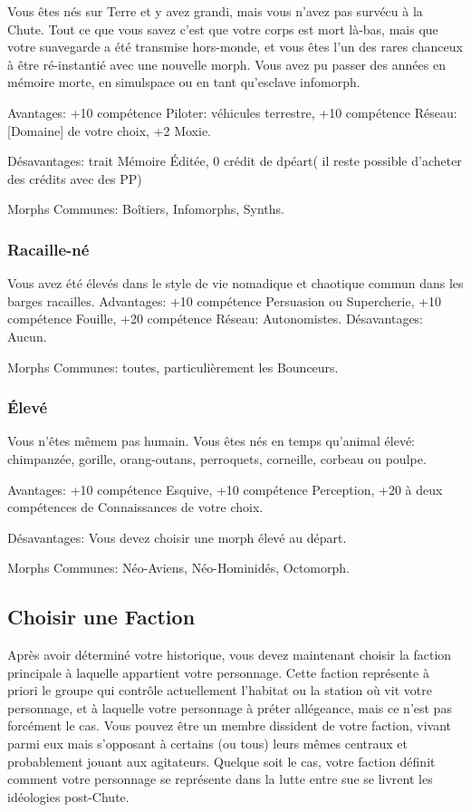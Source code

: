 Vous êtes nés sur Terre et y avez grandi, mais vous n'avez pas survécu à la Chute. Tout ce que vous savez c'est que votre corps est mort là-bas, mais que votre suavegarde a été transmise hors-monde, et vous êtes l'un des rares chanceux à être ré-instantié avec une nouvelle morph. Vous avez pu passer des années en mémoire morte, en simulspace ou en tant qu'esclave infomorph. 

Avantages: +10 compétence Piloter: véhicules terrestre, +10 compétence Réseau: [Domaine] de votre choix, +2 Moxie. 

Désavantages: trait Mémoire Éditée, 0 crédit de dpéart( il reste possible d'acheter des crédits avec des PP) 

Morphs Communes: Boîtiers, Infomorphs, Synths. 

\subsubsection{Racaille-né} \label{sec:scumborn} 

Vous avez été élevés dans le style de vie nomadique et chaotique commun dans les barges racailles. Advantages: +10 compétence Persuasion ou Supercherie, +10 compétence Fouille, +20 compétence Réseau: Autonomistes.  Désavantages: Aucun. 

Morphs Communes: toutes, particulièrement les Bounceurs. 

\subsubsection{Élevé} \label{sec:uplift} 

Vous n'êtes mêmem pas humain. Vous êtes nés en temps qu'animal élevé: chimpanzée, gorille, orang-outans, perroquets, corneille, corbeau ou poulpe. 

Avantages: +10 compétence Esquive, +10 compétence Perception, +20 à deux compétences de Connaissances de votre choix. 

Désavantages: Vous devez choisir une morph élevé au départ. 

Morphs Communes: Néo-Aviens, Néo-Hominidés, Octomorph. 

\subsection{Choisir une Faction} \label{sec:choose-faction} 

Après avoir déterminé votre historique, vous devez maintenant choisir la faction principale à laquelle appartient votre personnage. Cette faction représente à priori le groupe qui contrôle actuellement l'habitat ou la station où vit votre personnage, et à laquelle votre personnage à préter allégeance, mais ce n'est pas forcément le cas. Vous pouvez être un membre dissident de votre faction, vivant parmi eux mais s'opposant à certains (ou tous) leurs mêmes centraux et probablement jouant aux agitateurs. Quelque soit le cas, votre faction définit comment votre personnage se représente dans la lutte entre sue se livrent les idéologies post-Chute. 


